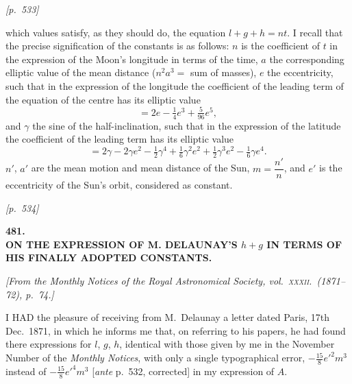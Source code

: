 \documentclass[11pt]{article}
\begin{document}

\bigskip
\noindent\textit{[p.~533]}

\medskip

which values satisfy, as they should do, the equation $l+g+h=nt$. I
recall that the precise signification of the constants is as follows:
$n$ is the coefficient of $t$ in the expression of the Moon's longitude
in terms of the time, $a$ the corresponding elliptic value of the mean
distance ($n^2a^3=$ sum of masses), $e$ the eccentricity, such that in
the expression of the longitude the coefficient of the leading term of
the equation of the centre has its elliptic value
\[
=2e-\tfrac{1}{4}e^3+\tfrac{5}{96}e^5,
\]
and $\gamma$ the sine of the half-inclination, such that in the
expression of the latitude the coefficient of the leading term has its
elliptic value
\[
=2\gamma-2\gamma e^2-\tfrac{1}{2}\gamma^4+\tfrac{1}{6}\gamma^2 e^2+\tfrac{1}{2}\gamma^3 e^2-\tfrac{1}{6}\gamma e^4.
\]
$n'$, $a'$ are the mean motion and mean distance of the Sun,
$m=\dfrac{n'}{n}$, and $e'$ is the eccentricity of the Sun's orbit,
considered as constant.


\newpage
\noindent\textit{[p.~534]}

\bigskip

\begin{center}
\textbf{\large 481.}\\[6pt]
\textbf{\Large ON THE EXPRESSION OF M. DELAUNAY'S $h+g$ IN TERMS OF}\\
\textbf{\Large HIS FINALLY ADOPTED CONSTANTS.}
\end{center}

\medskip

\noindent\textit{[From the Monthly Notices of the Royal Astronomical
Society, vol.~\textsc{xxxii}.\ (1871--72), p.~74.]}

\bigskip

I HAD the pleasure of receiving from M.~Delaunay a letter dated Paris,
17th Dec.\ 1871, in which he informs me that, on referring to his
papers, he had found there expressions for $l$, $g$, $h$, identical with
those given by me in the November Number of the \textit{Monthly Notices},
with only a single typographical error, $-\tfrac{15}{8}e'^2 m^3$ instead
of $-\tfrac{15}{8}e'^4 m^3$ [\textit{ante} p.~532, corrected] in my
expression of $A$.
\end{document}
